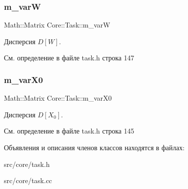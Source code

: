 \subsubsection{\texorpdfstring{m\+\_\+varW}{m\_varW}}
{\footnotesize\ttfamily Math\+::\+Matrix Core\+::\+Task\+::m\+\_\+varW\hspace{0.3cm}{\ttfamily [protected]}}

Дисперсия $D[W]$. 

См. определение в файле task.\+h строка 147

\hypertarget{class_core_1_1_task_a06a945ef15de5b97494fd20ce88470a6}{}\label{class_core_1_1_task_a06a945ef15de5b97494fd20ce88470a6} 
\subsubsection{\texorpdfstring{m\+\_\+var\+X0}{m\_varX0}}
{\footnotesize\ttfamily Math\+::\+Matrix Core\+::\+Task\+::m\+\_\+var\+X0\hspace{0.3cm}{\ttfamily [protected]}}

Дисперсия $D[X_0]$. 

См. определение в файле task.\+h строка 145



Объявления и описания членов классов находятся в файлах\+:\begin{DoxyCompactItemize}
\item 
src/core/task.\+h\item 
src/core/task.\+cc\end{DoxyCompactItemize}
